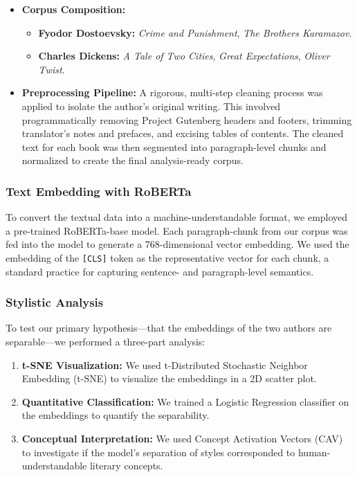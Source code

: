 \documentclass[sn-mathphys]{sn-jnl}%
\begin{document}
\begin{itemize}
    \item \textbf{Corpus Composition:}
    \begin{itemize}
        \item \textbf{Fyodor Dostoevsky:} \textit{Crime and Punishment}, \textit{The Brothers Karamazov}.
        \item \textbf{Charles Dickens:} \textit{A Tale of Two Cities}, \textit{Great Expectations}, \textit{Oliver Twist}.
    \end{itemize}
    \item \textbf{Preprocessing Pipeline:} A rigorous, multi-step cleaning process was applied to isolate the author's original writing. This involved programmatically removing Project Gutenberg headers and footers, trimming translator's notes and prefaces, and excising tables of contents. The cleaned text for each book was then segmented into paragraph-level chunks and normalized to create the final analysis-ready corpus.
\end{itemize}

\subsubsection{Text Embedding with RoBERTa}\label{subsubsec2.3.2}
To convert the textual data into a machine-understandable format, we employed a pre-trained RoBERTa-base model. Each paragraph-chunk from our corpus was fed into the model to generate a 768-dimensional vector embedding. We used the embedding of the \texttt{[CLS]} token as the representative vector for each chunk, a standard practice for capturing sentence- and paragraph-level semantics.

\subsubsection{Stylistic Analysis}\label{subsubsec2.3.3}
To test our primary hypothesis—that the embeddings of the two authors are separable—we performed a three-part analysis:
\begin{enumerate}
    \item \textbf{t-SNE Visualization:} We used t-Distributed Stochastic Neighbor Embedding (t-SNE) to visualize the embeddings in a 2D scatter plot.
    \item \textbf{Quantitative Classification:} We trained a Logistic Regression classifier on the embeddings to quantify the separability.
    \item \textbf{Conceptual Interpretation:} We used Concept Activation Vectors (CAV) to investigate if the model's separation of styles corresponded to human-understandable literary concepts.
\end{enumerate}
\end{document}
